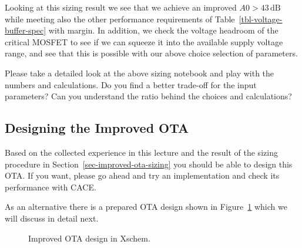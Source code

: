 \documentclass[
  a4paper,
  DIV=11,
  numbers=noendperiod]{scrartcl}
\begin{document}
Looking at this sizing result we see that we achieve an improved
\(A0 > 43\,\text{dB}\) while meeting also the other performance
requirements of Table~\ref{tbl-voltage-buffer-spec} with margin. In
addition, we check the voltage headroom of the critical MOSFET to see if
we can squeeze it into the available supply voltage range, and see that
this is possible with our above choice selection of parameters.

\begin{tcolorbox}[enhanced jigsaw, titlerule=0mm, left=2mm, coltitle=black, toprule=.15mm, breakable, opacitybacktitle=0.6, colframe=quarto-callout-tip-color-frame, bottomtitle=1mm, toptitle=1mm, opacityback=0, colbacktitle=quarto-callout-tip-color!10!white, title=\textcolor{quarto-callout-tip-color}{\faLightbulb}\hspace{0.5em}{Exercise: Improved OTA Sizing}, arc=.35mm, rightrule=.15mm, colback=white, bottomrule=.15mm, leftrule=.75mm]

Please take a detailed look at the above sizing notebook and play with
the numbers and calculations. Do you find a better trade-off for the
input parameters? Can you understand the ratio behind the choices and
calculations?

\end{tcolorbox}

\subsection{Designing the Improved
OTA}\label{designing-the-improved-ota}

Based on the collected experience in this lecture and the result of the
sizing procedure in Section~\ref{sec-improved-ota-sizing} you should be
able to design this OTA. If you want, please go ahead and try an
implementation and check its performance with CACE.

As an alternative there is a prepared OTA design shown in
Figure~\ref{fig-improved-ota-design} which we will discuss in detail
next.

\begin{figure}


\caption{\label{fig-improved-ota-design}Improved OTA design in Xschem.}

\end{figure}%
\end{document}
